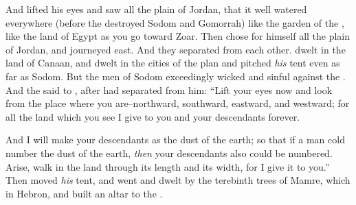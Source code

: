 \bverse And  lifted his eyes and saw all the plain of Jordan, that it \was well watered everywhere (before the \lord destroyed Sodom and Gomorrah) like the garden of the \lord, like the land of Egypt as you go toward Zoar.
\bverse Then  chose for himself all the plain of Jordan, and  journeyed east. And they separated from each other.
\bverse {} dwelt in the land of Canaan, and  dwelt in the cities of the plan and pitched \textit{his} tent even as far as Sodom.
\bverse But the men of Sodom \were exceedingly wicked and sinful against the \lord.
\bverse And the \lord said to , after  had separated from him: ``Lift your eyes now and look from the place where you are--northward, southward, eastward, and westward;
\bverse for all the land which you see I give to you and your descendants forever.

\bverse And I will make your descendants as the dust of the earth; so that if a man cold number the dust of the earth, \textit{then} your descendants also could be numbered.
\bverse Arise, walk in the land through its length and its width, for I give it to you.''
\bverse Then  moved \textit{his} tent, and went and dwelt by the terebinth trees of Mamre, which \are in Hebron, and built an altar to the \lord.
